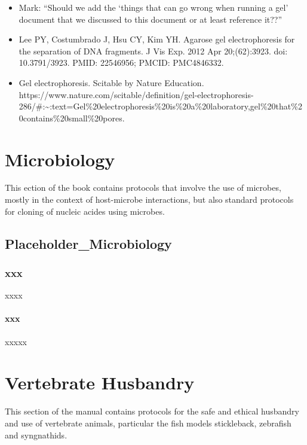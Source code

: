 \documentclass[
  letterpaper,
  DIV=11,
  numbers=noendperiod]{scrreprt}
\providecommand{\tightlist}{%
  \setlength{\itemsep}{0pt}\setlength{\parskip}{0pt}}\usepackage{longtable,booktabs,array}
\begin{document}
\begin{itemize}
\tightlist
\item
  Mark: ``Should we add the `things that can go wrong when running a
  gel' document that we discussed to this document or at least reference
  it??''
\item
  Lee PY, Costumbrado J, Hsu CY, Kim YH. Agarose gel electrophoresis for
  the separation of DNA fragments. J Vis Exp. 2012 Apr 20;(62):3923.
  doi: 10.3791/3923. PMID: 22546956; PMCID: PMC4846332.
\item
  Gel electrophoresis. Scitable by Nature Education.
  https://www.nature.com/scitable/definition/gel-electrophoresis-286/\#:\textasciitilde:text=Gel\%20electrophoresis\%20is\%20a\%20laboratory,gel\%20that\%20contains\%20small\%20pores.
\end{itemize}

\part{Microbiology}

This ection of the book contains protocols that involve the use of
microbes, mostly in the context of host-microbe interactions, but also
standard protocols for cloning of nucleic acides using microbes.

\hypertarget{sec-microbiology}{%
\chapter{Placeholder\_Microbiology}\label{sec-microbiology}}

\hypertarget{xxx}{%
\section{xxx}\label{xxx}}

xxxx

\hypertarget{xxx-1}{%
\subsection{xxx}\label{xxx-1}}

xxxxx

\part{Vertebrate Husbandry}

This section of the manual contains protocols for the safe and ethical
husbandry and use of vertebrate animals, particular the fish models
stickleback, zebrafish and syngnathids.
\end{document}
